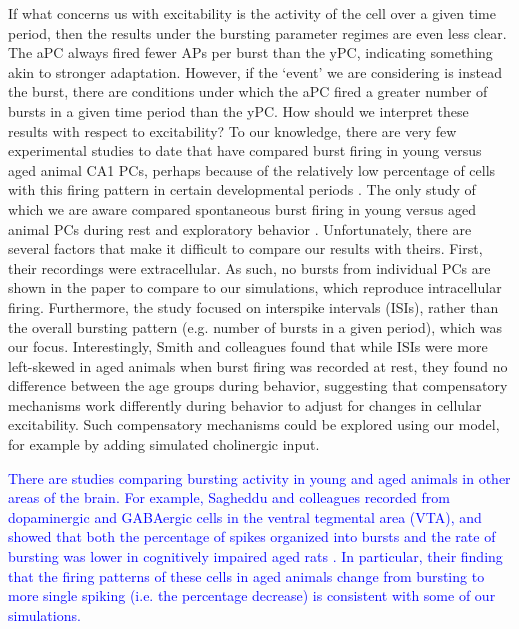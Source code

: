 \documentclass[10pt,letterpaper]{article}
\newcommand{\edit}[1]{\textcolor{blue}{#1}}
\begin{document}
 If what concerns us with excitability is the activity of the cell over a given time period, then the results under the bursting parameter regimes are even less clear. The aPC always fired fewer APs per burst than the yPC, indicating something akin to stronger adaptation. However, if the `event' we are considering is instead the burst, there are conditions under which the aPC fired a greater number of bursts in a given time period than the yPC. How should we interpret these results with respect to excitability? To our knowledge, there are very few experimental studies to date that have compared burst firing in young versus aged animal CA1 PCs, perhaps because of the relatively low percentage of cells with this firing pattern in certain developmental periods \cite{chen2005transitional}. The only study of which we are aware compared spontaneous burst firing in young versus aged animal PCs during rest and exploratory behavior \cite{smith2000effect}. Unfortunately, there are several factors that make it difficult to compare our results with theirs. First, their recordings were extracellular. As such, no bursts from individual PCs are shown in the paper to compare to our simulations, which reproduce intracellular firing. Furthermore, the study focused on interspike intervals (ISIs), rather than the overall bursting pattern (e.g. number of bursts in a given period), which was our focus. Interestingly, Smith and colleagues \cite{smith2000effect} found that while ISIs were more left-skewed in aged animals when burst firing was recorded at rest, they found no difference between the age groups during behavior, suggesting that compensatory mechanisms work differently during behavior to adjust for changes in cellular excitability. Such compensatory mechanisms could be explored using our model, for example by adding simulated cholinergic input. 
 
 \edit{There are studies comparing bursting activity in young and aged animals in other areas of the brain. For example, Sagheddu and colleagues recorded from dopaminergic and GABAergic cells in the ventral tegmental area (VTA), and showed that both the percentage of spikes organized into bursts and the rate of bursting was lower in cognitively impaired aged rats \cite{sagheddu2024cognitive}. In particular, their finding that the firing patterns of these cells in aged animals change from bursting to more single spiking (i.e. the percentage decrease) is consistent with some of our simulations.}
 
\end{document}
